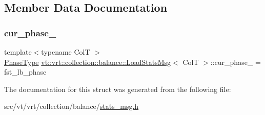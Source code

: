 \subsection{Member Data Documentation}
\mbox{\label{structvt_1_1vrt_1_1collection_1_1balance_1_1_load_stats_msg_ae720b043f578372906449227375aeaf4}} 
\subsubsection{\texorpdfstring{cur\+\_\+phase\+\_\+}{cur\_phase\_}}
{\footnotesize\ttfamily template$<$typename ColT $>$ \\
\hyperlink{namespacevt_a46ce6733d5cdbd735d561b7b4029f6d7}{Phase\+Type} \hyperlink{structvt_1_1vrt_1_1collection_1_1balance_1_1_load_stats_msg}{vt\+::vrt\+::collection\+::balance\+::\+Load\+Stats\+Msg}$<$ ColT $>$\+::cur\+\_\+phase\+\_\+ = fst\+\_\+lb\+\_\+phase\hspace{0.3cm}{\ttfamily [private]}}



The documentation for this struct was generated from the following file\+:\begin{DoxyCompactItemize}
\item 
src/vt/vrt/collection/balance/\hyperlink{stats__msg_8h}{stats\+\_\+msg.\+h}\end{DoxyCompactItemize}
